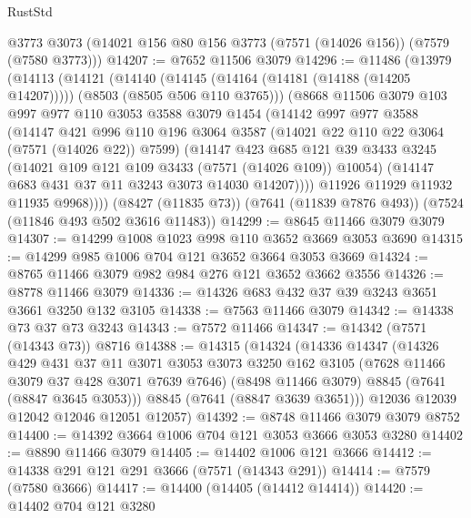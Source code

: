 \begin{lexlean}{RustStd}
\begin{coremodule}
{\begin{coremodule}
{{{{{{{{{{{{{{{{{{{{{{{{{{{{{{{{    @3773
    @3073
    (@14021 @156 @80 @156 @3773 (@7571 (@14026 @156)) (@7579 (@7580 @3773)))
@14207 := @7652 @11506 @3079
@14296 := @11486
    (@13979
      (@14113
        (@14121
          (@14140
            (@14145 (@14164 (@14181 (@14188 (@14205 @14207)))))
            (@8503 (@8505 @506 @110 @3765)))
          (@8668
            @11506
            @3079
            @103
            @997
            @977
            @110
            @3053
            @3588
            @3079
            @1454
            (@14142
              @997
              @977
              @3588
              (@14147
                @421
                @996
                @110
                @196
                @3064
                @3587
                (@14021 @22 @110 @22 @3064 (@7571 (@14026 @22)) @7599)
                (@14147
                  @423
                  @685
                  @121
                  @39
                  @3433
                  @3245
                  (@14021 @109 @121 @109 @3433 (@7571 (@14026 @109)) @10054)
                  (@14147 @683 @431 @37 @11 @3243 @3073 @14030 @14207))))
            @11926
            @11929
            @11932
            @11935
            @9968))))
    (@8427 (@11835 @73))
    (@7641 (@11839 @7876 @493))
    (@7524 (@11846 @493 @502 @3616 @11483))
@14299 := @8645 @11466 @3079 @3079
@14307 := @14299 @1008 @1023 @998 @110 @3652 @3669 @3053 @3690
@14315 := @14299 @985 @1006 @704 @121 @3652 @3664 @3053 @3669
@14324 := @8765 @11466 @3079 @982 @984 @276 @121 @3652 @3662 @3556
@14326 := @8778 @11466 @3079
@14336 := @14326 @683 @432 @37 @39 @3243 @3651 @3661 @3250 @132 @3105
@14338 := @7563 @11466 @3079
@14342 := @14338 @73 @37 @73 @3243
@14343 := @7572 @11466
@14347 := @14342 (@7571 (@14343 @73)) @8716
@14388 := @14315
    (@14324
      (@14336
        @14347
        (@14326
          @429
          @431
          @37
          @11
          @3071
          @3053
          @3073
          @3250
          @162
          @3105
          (@7628 @11466 @3079 @37 @428 @3071 @7639 @7646)
          (@8498 @11466 @3079)
          @8845
          (@7641 (@8847 @3645 @3053)))
        @8845
        (@7641 (@8847 @3639 @3651)))
      @12036
      @12039
      @12042
      @12046
      @12051
      @12057)
@14392 := @8748 @11466 @3079 @3079 @8752
@14400 := @14392 @3664 @1006 @704 @121 @3053 @3666 @3053 @3280
@14402 := @8890 @11466 @3079
@14405 := @14402 @1006 @121 @3666
@14412 := @14338 @291 @121 @291 @3666 (@7571 (@14343 @291))
@14414 := @7579 (@7580 @3666)
@14417 := @14400 (@14405 (@14412 @14414))
@14420 := @14402 @704 @121 @3280
}}}}}}}}}}}}}}}}}}}}}}}}}}}}}}}}
\end{coremodule}}
\end{coremodule}
\end{lexlean}
